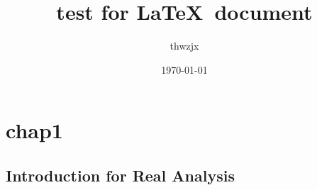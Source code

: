 \documentclass{article}
\title{test for \LaTeX\ document}
\author{thwzjx}
\date{\today}
\begin{document}
\maketitle
\tableofcontents
\section{chap1}
\subsection{Introduction for Real Analysis}
\end{document}
